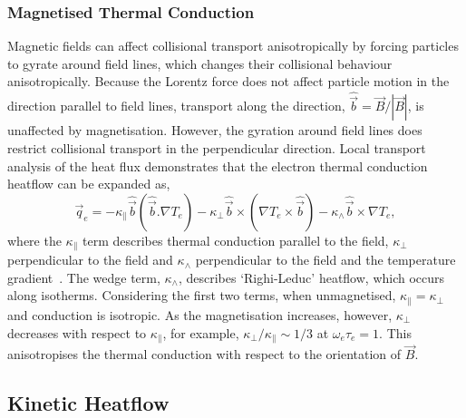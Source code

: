 \subsubsection{Magnetised Thermal Conduction}%
\label{sec:theory_magheatflow}

Magnetic fields can affect collisional transport anisotropically by forcing particles to gyrate around field lines, which changes their collisional behaviour anisotropically.
Because the Lorentz force does not affect particle motion in the direction parallel to field lines, transport along the direction, $\hat{\vec{b}}=\vec{B}/|\vec{B}|$, is unaffected by magnetisation.
However, the gyration around field lines does restrict collisional transport in the perpendicular direction.
Local transport analysis of the heat flux demonstrates that the electron thermal conduction heatflow can be expanded as,
\begin{equation}
    \vec{q}_e = - \kappa_{\parallel} \hat{\vec{b}} \left( \hat{\vec{b}}.\nabla T_e \right) - \kappa_{\perp} \hat{\vec{b}} \times \left( \nabla T_e \times \hat{\vec{b}} \right) - \kappa_{\wedge} \hat{\vec{b}} \times \nabla T_e,
\end{equation}
where the $\kappa_{\parallel}$ term describes thermal conduction parallel to the field, $\kappa_{\perp}$ perpendicular to the field and $\kappa_{\wedge}$ perpendicular to the field and the temperature gradient~\cite{epperlein_plasma_1986}.
The wedge term, $\kappa_{\wedge}$, describes `Righi-Leduc' heatflow, which occurs along isotherms.
Considering the first two terms, when unmagnetised, $\kappa_{\parallel}=\kappa_{\perp}$ and conduction is isotropic.
As the magnetisation increases, however, $\kappa_{\perp}$ decreases with respect to $\kappa_{\parallel}$, for example, $\kappa_{\perp}/\kappa_{\parallel} \sim 1/3$ at $\omega_e\tau_e = 1$.
This anisotropises the thermal conduction with respect to the orientation of $\vec{B}$.

\subsection{Kinetic Heatflow}%
\label{sec:theory_kineticheatflow}


